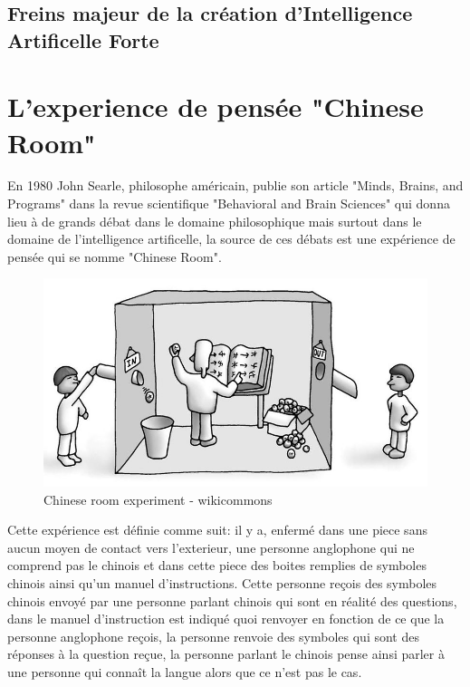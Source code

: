 \newpage
\subsection*{Freins majeur de la création d'Intelligence Artificelle Forte}
\section{L'experience de pensée "Chinese Room"}
En 1980 John Searle, philosophe américain, publie son article "Minds, Brains, and Programs" dans la revue 
scientifique "Behavioral and Brain Sciences" qui donna lieu à de grands débat dans le domaine philosophique 
mais surtout dans le domaine de l'intelligence artificelle, 
la source de ces débats est une expérience de pensée qui se nomme "Chinese Room". \newline

\begin{figure}[H]
    \centering
    \includegraphics[width=1\textwidth]{Images/chineseroom}
    \caption{Chinese room experiment - wikicommons}
	\label{fig:chineseroom}
\end{figure}

Cette expérience est définie comme suit: \newline
il y a, enfermé dans une piece sans aucun moyen de contact vers l'exterieur, une personne anglophone qui ne comprend 
pas le chinois et dans cette piece des boites remplies de symboles chinois ainsi qu'un manuel d'instructions.
Cette personne reçois des symboles chinois envoyé par une personne parlant chinois qui sont en réalité des questions,
dans le manuel d'instruction est indiqué quoi renvoyer en fonction de ce que la personne anglophone reçois,
la personne renvoie des symboles qui sont des réponses à la question reçue, la personne parlant le chinois
pense ainsi parler à une personne qui connaît la langue alors que ce n'est pas le cas. 
\newpage

